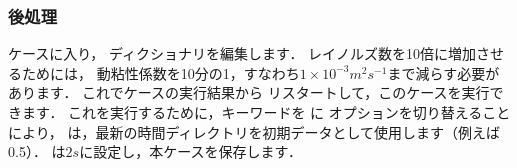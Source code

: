 \subsubsection{後処理}
\label{sssec:2.1.7.1}
ケースに入り，
%
%
ディクショナリを編集します．
レイノルズ数を10倍に増加させるためには，
動粘性係数を10分の1，すなわち$1 \times 10^{-3} \unit{m^{2}s^{-1}}$まで減らす必要があります．
これでケースの実行結果から
%
リスタートして，このケースを実行できます．
これを実行するために，キーワードを
%
%
に
オプションを切り替えることにより，
は，最新の時間ディレクトリを初期データとして使用します（例えば0.5）．
は$2\unit{s}$に設定し，本ケースを保存します．

